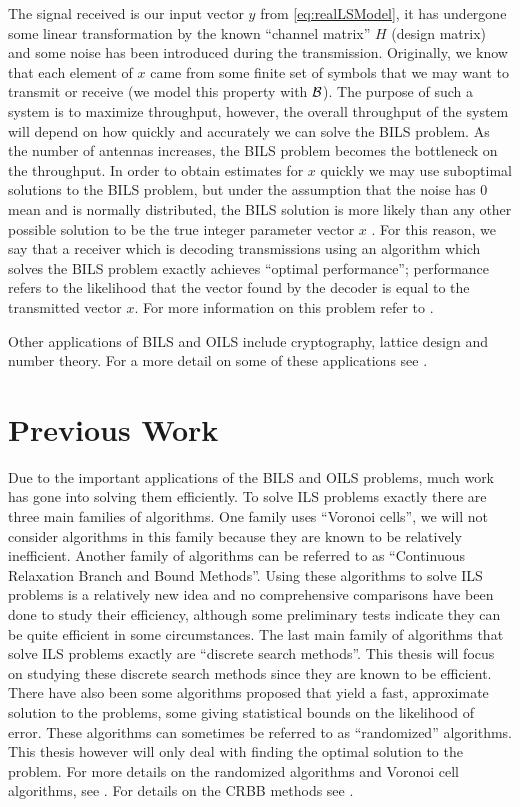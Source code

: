 \documentclass[12pt,Bold,letterpaper]{mcgilletdclass}
\newcommand{\boxcon}{{\cal B}}
\newcommand{\vsp}{\vspace{\baselineskip}}
\begin{document}
The signal received is our input vector $y$ from
\eqref{eq:realLSModel}, it has undergone some linear transformation by the known
``channel matrix'' $H$ (design matrix) and some noise has been introduced during
the transmission. Originally, we know that each element of $x$ came from some
finite set of symbols that we may want to transmit or receive (we model
this property with $\boxcon$). The purpose of such a system is to maximize
throughput, however, the overall throughput of the system will depend on how
quickly and accurately we can solve the BILS problem. As the number of antennas increases, the BILS problem becomes the bottleneck on the throughput. In order to obtain estimates for $x$ quickly we may use suboptimal solutions to the BILS problem, but under the assumption that the noise has $0$ mean and is
normally distributed, the BILS solution is more likely than any other possible
solution to be the true integer parameter vector $x$ \cite{Han11}. For this reason, we say that a receiver which is decoding transmissions using an algorithm which solves the BILS problem exactly achieves ``optimal performance''; performance refers to the likelihood that the vector found by the decoder is equal to the transmitted vector $x$. For more information on this problem refer to \cite{Jan04}.

Other applications of BILS and OILS include cryptography, lattice design and number theory. For a more detail on some of these applications see \cite{HanPS11}.

\vsp \section{Previous Work} \label{sec:prevWork}
Due to the important applications of the BILS and OILS problems, much work has
gone into solving them efficiently. To solve ILS problems exactly there are
three main families of algorithms. One family uses ``Voronoi cells'', we will
not consider algorithms in this family because they are known to be relatively
inefficient. Another family of algorithms can be referred to as ``Continuous
Relaxation Branch and Bound Methods''. Using these algorithms to solve ILS
problems is a relatively new idea and no comprehensive comparisons have been
done to study their efficiency, although some preliminary tests indicate they
can be quite efficient in some circumstances. The last main family of algorithms
that solve ILS problems exactly are ``discrete search methods''. This thesis
will focus on studying these discrete search methods since they are known to be
efficient. There have also been some algorithms proposed that yield a fast,
approximate solution to the problems, some giving statistical bounds on the
likelihood of error. These algorithms can sometimes be referred to as
``randomized'' algorithms. This thesis however will only deal with finding the
optimal solution to the problem. For more details on the randomized algorithms
and Voronoi cell algorithms, see \cite{HanPS11}. For details on the CRBB methods
see \cite{Ku11}. 
\end{document}
